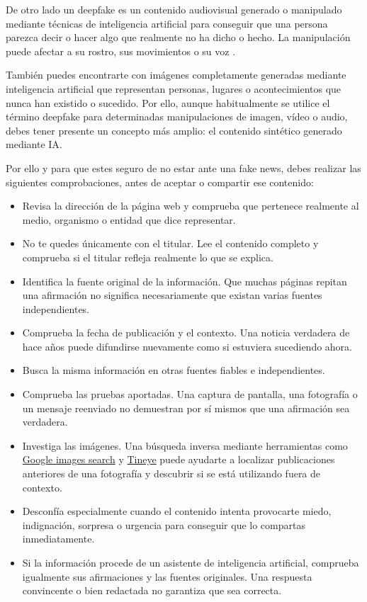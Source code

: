 \documentclass[
  spanish,
  a4paper,
  openany]{book}
\begin{document}
De otro lado un deepfake es un contenido audiovisual generado o manipulado mediante técnicas de inteligencia artificial para conseguir que una persona parezca decir o hacer algo que realmente no ha dicho o hecho. La manipulación puede afectar a su rostro, sus movimientos o su voz \citep{WIKI-deepfake}.

También puedes encontrarte con imágenes completamente generadas mediante inteligencia artificial que representan personas, lugares o acontecimientos que nunca han existido o sucedido. Por ello, aunque habitualmente se utilice el término deepfake para determinadas manipulaciones de imagen, vídeo o audio, debes tener presente un concepto más amplio: el contenido sintético generado mediante IA.

Por ello y para que estes seguro de no estar ante una fake news, debes realizar las siguientes comprobaciones, antes de aceptar o compartir ese contenido:

\begin{itemize}
\item
  Revisa la dirección de la página web y comprueba que pertenece realmente al medio, organismo o entidad que dice representar.
\item
  No te quedes únicamente con el titular. Lee el contenido completo y comprueba si el titular refleja realmente lo que se explica.
\item
  Identifica la fuente original de la información. Que muchas páginas repitan una afirmación no significa necesariamente que existan varias fuentes independientes.
\item
  Comprueba la fecha de publicación y el contexto. Una noticia verdadera de hace años puede difundirse nuevamente como si estuviera sucediendo ahora.
\item
  Busca la misma información en otras fuentes fiables e independientes.
\item
  Comprueba las pruebas aportadas. Una captura de pantalla, una fotografía o un mensaje reenviado no demuestran por sí mismos que una afirmación sea verdadera.
\item
  Investiga las imágenes. Una búsqueda inversa mediante herramientas como \href{https://www.google.es/imghp?hl=es}{Google images search} y \href{https://tineye.com/}{Tineye} puede ayudarte a localizar publicaciones anteriores de una fotografía y descubrir si se está utilizando fuera de contexto.
\item
  Desconfía especialmente cuando el contenido intenta provocarte miedo, indignación, sorpresa o urgencia para conseguir que lo compartas inmediatamente.
\item
  Si la información procede de un asistente de inteligencia artificial, comprueba igualmente sus afirmaciones y las fuentes originales. Una respuesta convincente o bien redactada no garantiza que sea correcta.
\end{itemize}
\end{document}

